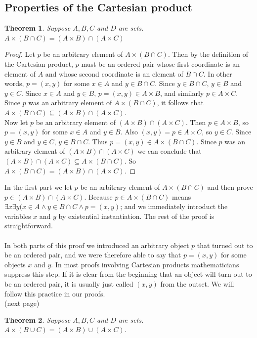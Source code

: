 \documentclass{report}
\newtheorem*{theorem}{Theorem}
\theoremstyle{definition}
\begin{document}
\subsection{Properties of the Cartesian product}
\begin{theorem} 
Suppose $A,B,C$ and $D$ are sets. $A\times(B\cap C)=(A\times B)\cap(A\times C)$
\end{theorem}
\begin{proof} Let $p$ be an arbitrary element of $A\times(B\cap C)$. Then by the definition of the Cartesian product, $p$ must be an ordered pair whose first coordinate is an element of $A$ and whose 
second coordinate is an element of $B\cap C$. In other words, $p=(x,y)$ for some $x\in A$ and $y\in B\cap C$. Since $y\in B\cap C$, $y\in B$ and $y\in C$. Since $x\in A$ and $y\in B$, 
$p=(x,y)\in A\times B$, and similarly $p\in A\times C$. Since $p$ was an arbitrary element of $A\times(B\cap C)$, it follows that $A\times(B\cap C)\subseteq(A\times B)\cap(A\times C)$.\\
\indent Now let $p$ be an arbitrary element of $(A\times B)\cap(A\times C)$. Then $p\in A\times B$, so $p=(x,y)$ for some $x\in A$ and $y\in B$. Also $(x,y)=p\in A\times C$, so $y\in C$. Since 
$y\in B$ and $y\in C$, $y\in B\cap C$. Thus $p=(x,y)\in A\times(B\cap C)$. Since $p$ was an arbitrary element of $(A\times B)\cap(A\times C)$ we can conclude that 
$(A\times B)\cap(A\times C)\subseteq A\times(B\cap C)$. So $A\times(B\cap C)=(A\times B)\cap(A\times C)$.
\end{proof}
\noindent In the first part we let $p$ be an arbitrary element of $A\times(B\cap C)$ and then prove $p\in(A\times B)\cap(A\times C)$. Because $p\in A\times (B\cap C)$ means 
$\exists x\exists y(x\in A\land y\in B\cap C\land p=(x,y)$; and we immediately introduct the variables $x$ and $y$ by existential instantiation. The rest of the proof is straightforward.\\
\vspace{1mm}\\
In both parts of this proof we introduced an arbitrary object $p$ that turned out to be an ordered pair, and we were therefore able to say that $p=(x,y)$ for some objects $x$ and $y$. In most proofs
involving Cartesian products mathematicians suppress this step. If it is clear from the beginning that an object will turn out to be an ordered pair, it is usually just called $(x,y)$ from the
outset. We will follow this practice in our proofs.\\
(next page)\newpage
\begin{theorem}
Suppose $A,B,C$ and $D$ are sets. $A\times(B\cup C)=(A\times B)\cup(A\times C)$.
\end{theorem}
\end{document}
